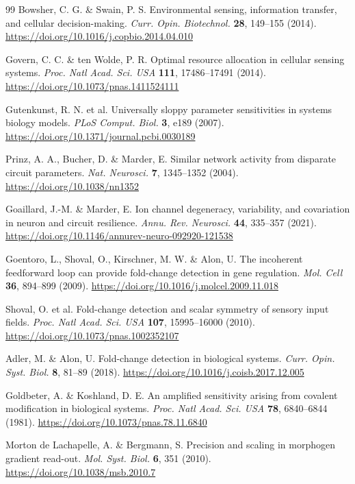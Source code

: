 \documentclass[11pt,a4paper]{article}
\begin{document}
\begin{thebibliography}{99}
Bowsher, C. G. \& Swain, P. S. Environmental sensing, information transfer, and cellular decision-making. \emph{Curr. Opin. Biotechnol.} \textbf{28}, 149--155 (2014). \url{https://doi.org/10.1016/j.copbio.2014.04.010}

Govern, C. C. \& ten Wolde, P. R. Optimal resource allocation in cellular sensing systems. \emph{Proc. Natl Acad. Sci. USA} \textbf{111}, 17486--17491 (2014). \url{https://doi.org/10.1073/pnas.1411524111}

Gutenkunst, R. N. et al. Universally sloppy parameter sensitivities in systems biology models. \emph{PLoS Comput. Biol.} \textbf{3}, e189 (2007). \url{https://doi.org/10.1371/journal.pcbi.0030189}

Prinz, A. A., Bucher, D. \& Marder, E. Similar network activity from disparate circuit parameters. \emph{Nat. Neurosci.} \textbf{7}, 1345--1352 (2004). \url{https://doi.org/10.1038/nn1352}

Goaillard, J.-M. \& Marder, E. Ion channel degeneracy, variability, and covariation in neuron and circuit resilience. \emph{Annu. Rev. Neurosci.} \textbf{44}, 335--357 (2021). \url{https://doi.org/10.1146/annurev-neuro-092920-121538}

Goentoro, L., Shoval, O., Kirschner, M. W. \& Alon, U. The incoherent feedforward loop can provide fold-change detection in gene regulation. \emph{Mol. Cell} \textbf{36}, 894--899 (2009). \url{https://doi.org/10.1016/j.molcel.2009.11.018}

Shoval, O. et al. Fold-change detection and scalar symmetry of sensory input fields. \emph{Proc. Natl Acad. Sci. USA} \textbf{107}, 15995--16000 (2010). \url{https://doi.org/10.1073/pnas.1002352107}

Adler, M. \& Alon, U. Fold-change detection in biological systems. \emph{Curr. Opin. Syst. Biol.} \textbf{8}, 81--89 (2018). \url{https://doi.org/10.1016/j.coisb.2017.12.005}

Goldbeter, A. \& Koshland, D. E. An amplified sensitivity arising from covalent modification in biological systems. \emph{Proc. Natl Acad. Sci. USA} \textbf{78}, 6840--6844 (1981). \url{https://doi.org/10.1073/pnas.78.11.6840}

Morton de Lachapelle, A. \& Bergmann, S. Precision and scaling in morphogen gradient read-out. \emph{Mol. Syst. Biol.} \textbf{6}, 351 (2010). \url{https://doi.org/10.1038/msb.2010.7}


\end{thebibliography}
\end{document}
